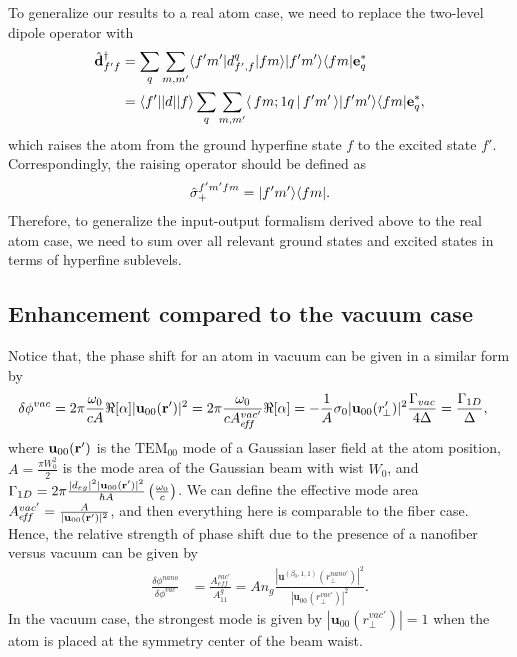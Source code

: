 \documentclass[preprint,aps,pra,onecolumn]{revtex4-1} %
\begin{document}

To generalize our results to a real atom case, we need to replace the two-level dipole operator with
\begin{align}
	\hat{ \mathbf{d} }_{f' f}^\dagger  & = \sum_q \sum_{m, m'}  \langle{f' m'}\rvert d_{f',f}^q \lvert{f m}\rangle \lvert{f' m'}\rangle\langle{f m}\rvert \mathbf{e}_q^* \\
	& = \langle{ f' }\rvert| d | \lvert{ f }\rangle \sum_q \sum_{m, m'}  \langle\, f m; 1 q\,\vert\, f' m' \,\rangle \lvert{f' m'}\rangle\langle{f m}\rvert \mathbf{e}_q^*,
\end{align}
which raises the atom from the ground hyperfine state $f$ to the excited state $f'$. Correspondingly, the raising operator should be defined as
\begin{align}
\hat{\sigma}_+^{f'm'fm} = \lvert{f' m'}\rangle\langle{f m}\rvert.
\end{align}
Therefore, to generalize the input-output formalism derived above to the real atom case, we need to sum over all relevant ground states and excited states in terms of hyperfine sublevels.


\subsection{Enhancement compared to the vacuum case}
Notice that, the phase shift for an atom in vacuum can be given in a similar form by
\begin{align}
\delta\phi^{vac} &= 2\pi \frac{\omega_0}{cA} \Re[\alpha] |\mathbf{u}_{00}(\mathbf{r}')|^2 =  2\pi 
\frac{\omega_0}{c A^{vac'}_{e\!f\!f}} \Re[\alpha]=-\frac{1}{A} \sigma_0 |\mathbf{u}_{00} (r'_{\!\perp})|^2 
\frac{\Gamma_{vac}}{4\Delta}=\frac{\Gamma_{1D}}{\Delta},
\end{align}
where $\mathbf{u}_{00}(\mathbf{r}')  $ is the $\mathrm{TEM}_{00}$ mode of a Gaussian laser field at the atom 
position, $ A=\frac{\pi W_0^2}{2} $ is the mode area of the Gaussian beam with wist $ W_0 $, and $ 
\Gamma_{1D}=2\pi \frac{|d_{eg}|^2|\mathbf{u}_{00}(\mathbf{r}')|^2}{\hbar A}\left( \frac{\omega_0}{c}\right) 
$. We can define the effective mode area $A_{e\!f\!f}^{vac'}=\frac{A}{|\mathbf{u}_{00}(\mathbf{r}')|^2}  $, and 
then everything here is comparable to the fiber case. Hence, the relative strength of phase shift due to 
the presence of a nanofiber versus vacuum can be 
given by
\begin{align}
\frac{\delta\phi^{nano}}{\delta\phi^{vac}} &=\frac{A_{e\!f\!f}^{vac'}}{A^g_{11}}=  A n_g\! \frac{ 
|\mathbf{u}^{(\beta_0,1,1)}(r_\perp^{nano'})|^2}{|\mathbf{u}_{00}(r_\perp^{vac'})|^2}.
\end{align}
In the vacuum case, the strongest mode is given by $ |\mathbf{u}_{00}(r_\perp^{vac'})|=1 $ when the atom is placed at the symmetry center of the beam waist. 
\end{document}
